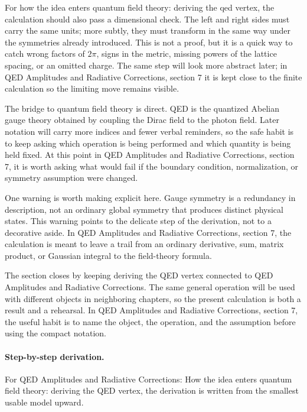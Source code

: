 For how the idea enters quantum field theory: deriving the qed vertex, the calculation should also pass a dimensional check.  The left and right sides must carry the same units; more subtly, they must transform in the same way under the symmetries already introduced.  This is not a proof, but it is a quick way to catch wrong factors of \(2\pi\), signs in the metric, missing powers of the lattice spacing, or an omitted charge.  The same step will look more abstract later; in QED Amplitudes and Radiative Corrections, section 7 it is kept close to the finite calculation so the limiting move remains visible.

The bridge to quantum field theory is direct.  QED is the quantized Abelian gauge theory obtained by coupling the Dirac field to the photon field.  Later notation will carry more indices and fewer verbal reminders, so the safe habit is to keep asking which operation is being performed and which quantity is being held fixed.  At this point in QED Amplitudes and Radiative Corrections, section 7, it is worth asking what would fail if the boundary condition, normalization, or symmetry assumption were changed.

One warning is worth making explicit here.  Gauge symmetry is a redundancy in description, not an ordinary global symmetry that produces distinct physical states.  This warning points to the delicate step of the derivation, not to a decorative aside.  In QED Amplitudes and Radiative Corrections, section 7, the calculation is meant to leave a trail from an ordinary derivative, sum, matrix product, or Gaussian integral to the field-theory formula.

The section closes by keeping deriving the QED vertex connected to QED Amplitudes and Radiative Corrections.  The same general operation will be used with different objects in neighboring chapters, so the present calculation is both a result and a rehearsal.  In QED Amplitudes and Radiative Corrections, section 7, the useful habit is to name the object, the operation, and the assumption before using the compact notation.



\paragraph{Step-by-step derivation.}

For QED Amplitudes and Radiative Corrections: How the idea enters quantum field theory: deriving the QED vertex, the derivation is written from the smallest usable model upward.

